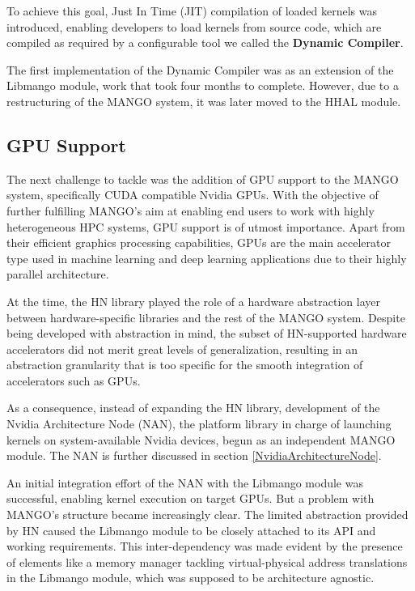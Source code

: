 To achieve this goal, Just In Time (JIT) compilation of loaded kernels was introduced, enabling developers to load kernels from source code, which are compiled as required by a configurable tool we called the \textbf{Dynamic Compiler}.

The first implementation of the Dynamic Compiler was as an extension of the Libmango module, work that took four months to complete. However, due to a restructuring of the MANGO system, it was later moved to the HHAL module.

\subsection{GPU Support}

The next challenge to tackle was the addition of GPU support to the MANGO system, specifically CUDA compatible Nvidia GPUs. 
With the objective of further fulfilling MANGO's aim at enabling end users to work with highly heterogeneous HPC systems, GPU support is of utmost importance. Apart from their efficient graphics processing capabilities, GPUs are the main accelerator type used in machine learning and deep learning applications due to their highly parallel architecture.

At the time, the HN library played the role of a hardware abstraction layer between hardware-specific libraries and the rest of the MANGO system. Despite being developed with abstraction in mind, the subset of HN-supported hardware accelerators did not merit great levels of generalization, resulting in an abstraction granularity that is too specific for the smooth integration of accelerators such as GPUs.

As a consequence, instead of expanding the HN library, development of the Nvidia Architecture Node (NAN), the platform library in charge of launching kernels on system-available Nvidia devices, begun as an independent MANGO module. The NAN is further discussed in section \ref{NvidiaArchitectureNode}.

An initial integration effort of the NAN with the Libmango module was successful, enabling kernel execution on target GPUs. 
But a problem with MANGO's structure became increasingly clear. The limited abstraction provided by HN caused the Libmango module to be closely attached to its API and working requirements. This inter-dependency was made evident by the presence of elements like a memory manager tackling virtual-physical address translations in the Libmango module, which was supposed to be architecture agnostic.

